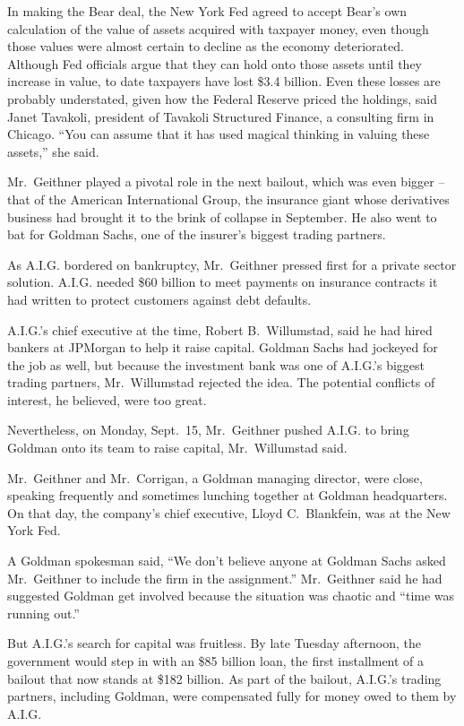 \documentclass[12pt,a4paper,onecolumn]{article}
\begin{document}
In making the Bear deal, the New York Fed agreed to accept Bear's own calculation of the value of
assets acquired with taxpayer money, even though those values were almost certain to decline as the
economy deteriorated. Although Fed officials argue that they can hold onto those assets until they
increase in value, to date taxpayers have lost \$3.4 billion. Even these losses are probably
understated, given how the Federal Reserve priced the holdings, said Janet Tavakoli, president of
Tavakoli Structured Finance, a consulting firm in Chicago. ``You can assume that it has used magical
thinking in valuing these assets,'' she said.

Mr.~Geithner played a pivotal role in the next bailout, which was even bigger -- that of the
American International Group, the insurance giant whose derivatives business had brought it to the
brink of collapse in September. He also went to bat for Goldman Sachs, one of the insurer's biggest
trading partners.

As A.I.G. bordered on bankruptcy, Mr.~Geithner pressed first for a private sector solution. A.I.G.
needed \$60 billion to meet payments on insurance contracts it had written to protect customers
against debt defaults.

A.I.G.'s chief executive at the time, Robert B.~Willumstad, said he had hired bankers at JPMorgan to
help it raise capital. Goldman Sachs had jockeyed for the job as well, but because the investment
bank was one of A.I.G.'s biggest trading partners, Mr.~Willumstad rejected the idea. The potential
conflicts of interest, he believed, were too great.

Nevertheless, on Monday, Sept.~15, Mr.~Geithner pushed A.I.G. to bring Goldman onto its team to
raise capital, Mr.~Willumstad said.

Mr.~Geithner and Mr.~Corrigan, a Goldman managing director, were close, speaking frequently and
sometimes lunching together at Goldman headquarters. On that day, the company's chief executive,
Lloyd C.~Blankfein, was at the New York Fed.

A Goldman spokesman said, ``We don't believe anyone at Goldman Sachs asked Mr.~Geithner to include
the firm in the assignment.'' Mr.~Geithner said he had suggested Goldman get involved because the
situation was chaotic and ``time was running out.''

But A.I.G.'s search for capital was fruitless. By late Tuesday afternoon, the government would step
in with an \$85 billion loan, the first installment of a bailout that now stands at \$182 billion.
As part of the bailout, A.I.G.'s trading partners, including Goldman, were compensated fully for
money owed to them by A.I.G.
\end{document}
